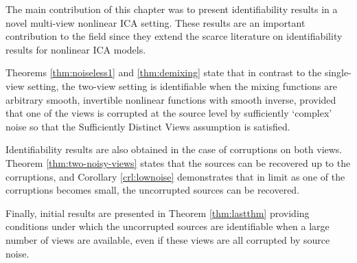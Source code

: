 The main contribution of this chapter was to present identifiability results in a novel multi-view nonlinear ICA setting.
These results are an important contribution to the field since they extend the scarce literature on identifiability results for nonlinear ICA models.


Theorems \ref{thm:noiseless1} and \ref{thm:demixing} state that in contrast to the single-view setting, the two-view setting is identifiable when the mixing functions are arbitrary smooth, invertible nonlinear functions with smooth inverse, provided that one of the views is corrupted at the source level by sufficiently `complex' noise so that the Sufficiently Distinct Views assumption is satisfied. 

Identifiability results are also obtained in the case of corruptions on both views. Theorem \ref{thm:two-noisy-views} states that the sources can be recovered up to the corruptions, and Corollary \ref{crl:lownoise} demonstrates that in limit as one of the corruptions becomes small, the uncorrupted sources can be recovered.

Finally, initial results are presented in Theorem \ref{thm:lastthm} providing conditions under which the uncorrupted sources are identifiable when a large number of views are available, even if these views are all corrupted by source noise.



%




